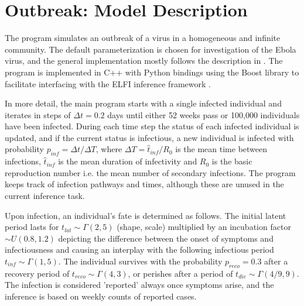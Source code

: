 \documentclass{article}
\begin{document}
    \section{Outbreak: Model Description}

    The program simulates an outbreak of a virus in a homogeneous and infinite community. The default parameterization is chosen for investigation of the Ebola virus, and the general implementation mostly follows the description in \citet{Britton}. The program is implemented in C++ with Python bindings using the Boost library to facilitate interfacing with the ELFI inference framework \citep{Lintusaari}.

    In more detail, the main program starts with a single infected individual and iterates in steps of $\Delta t = 0.2$ days until either 52 weeks pass or 100,000 individuals have been infected. During each time step the status of each infected individual is updated, and if the current status is infectious, a new individual is infected with probability $p_{inf} = \Delta t / \Delta T$, where $\Delta T = \hat t_{inf} / R_0$ is the mean time between infections, $\hat t_{inf}$ is the mean duration of infectivity and $R_0$ is the basic reproduction number i.e. the mean number of secondary infections. The program keeps track of infection pathways and times, although these are unused in the current inference task.

    Upon infection, an individual's fate is determined as follows. The initial latent period lasts for $t_{lat} \sim \Gamma(2, 5)$ (shape, scale) multiplied by an incubation factor $\sim U(0.8, 1.2)$ depicting the difference between the onset of symptoms and infectiousness and causing an interplay with the following infectious period $t_{inf} \sim \Gamma(1, 5)$. The individual survives with the probability $p_{reco} = 0.3$ after a recovery period of $t_{reco} \sim \Gamma(4, 3)$, or perishes after a period of $t_{die} \sim \Gamma(4/9, 9)$. The infection is considered 'reported' always once symptoms arise, and the inference is based on weekly counts of reported cases. 

    
    
\end{document}
